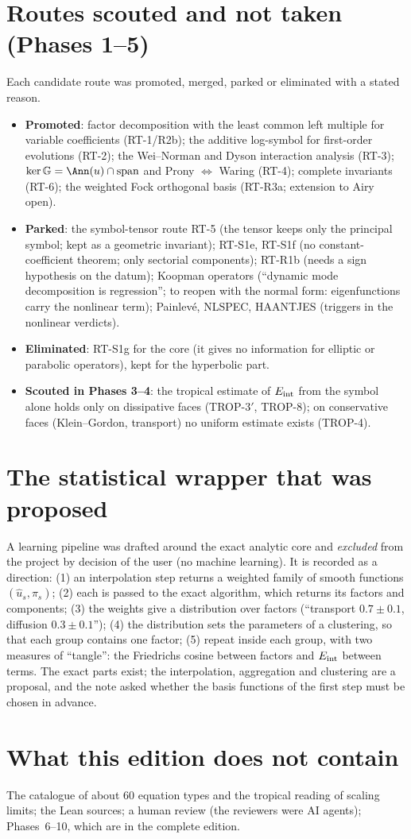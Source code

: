 \section{Routes scouted and not taken (Phases 1--5)}

Each candidate route was promoted, merged, parked or eliminated with a stated reason.
\begin{itemize}
\item \textbf{Promoted}: factor decomposition with the least common left multiple for variable coefficients (RT-1/R2b); the additive log-symbol for first-order evolutions (RT-2); the Wei--Norman and Dyson interaction analysis (RT-3); $\ker\mathbb G=\Ann(u)\cap\mathrm{span}$ and Prony $\Leftrightarrow$ Waring (RT-4); complete invariants (RT-6); the weighted Fock orthogonal basis (RT-R3a; extension to Airy open).
\item \textbf{Parked}: the symbol-tensor route RT-5 (the tensor keeps only the principal symbol; kept as a geometric invariant); RT-S1e, RT-S1f (no constant-coefficient theorem; only sectorial components); RT-R1b (needs a sign hypothesis on the datum); Koopman operators (``dynamic mode decomposition is regression''; to reopen with the normal form: eigenfunctions carry the nonlinear term); Painlev\'e, NLSPEC, HAANTJES (triggers in the nonlinear verdicts).
\item \textbf{Eliminated}: RT-S1g for the core (it gives no information for elliptic or parabolic operators), kept for the hyperbolic part.
\item \textbf{Scouted in Phases 3--4}: the tropical estimate of $E_{\rm int}$ from the symbol alone holds only on dissipative faces (TROP-3$'$, TROP-8); on conservative faces (Klein--Gordon, transport) no uniform estimate exists (TROP-4).
\end{itemize}

\section{The statistical wrapper that was proposed}

A learning pipeline was drafted around the exact analytic core and \emph{excluded} from the project by decision of the user (no machine learning). It is recorded as a direction: (1) an interpolation step returns a weighted family of smooth functions $(\hat u_s,\pi_s)$; (2) each is passed to the exact algorithm, which returns its factors and components; (3) the weights give a distribution over factors (``transport $0.7\pm0.1$, diffusion $0.3\pm0.1$''); (4) the distribution sets the parameters of a clustering, so that each group contains one factor; (5) repeat inside each group, with two measures of ``tangle'': the Friedrichs cosine between factors and $E_{\rm int}$ between terms. The exact parts exist; the interpolation, aggregation and clustering are a proposal, and the note asked whether the basis functions of the first step must be chosen in advance.

\section{What this edition does not contain}

The catalogue of about $60$ equation types and the tropical reading of scaling limits; the Lean sources; a human review (the reviewers were AI agents); Phases~6--10, which are in the complete edition.
